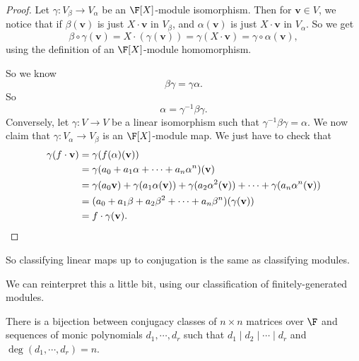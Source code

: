 \documentclass[a4paper]{article}
\begin{document}
\begin{proof}
  Let $\gamma: V_\beta \to V_\alpha$ be an $\F[X]$-module isomorphism. Then for $\mathbf{v} \in V$, we notice that if $\beta (\mathbf{v})$ is just $X \cdot \mathbf{v}$ in $V_\beta$, and $\alpha(\mathbf{v})$ is just $X \cdot \mathbf{v}$ in $V_\alpha$. So we get
  \[
    \beta \circ \gamma(\mathbf{v}) = X \cdot (\gamma(\mathbf{v})) = \gamma(X \cdot \mathbf{v}) = \gamma \circ \alpha(\mathbf{v}),
  \]
  using the definition of an $\F[X]$-module homomorphism.

  So we know
  \[
    \beta\gamma = \gamma\alpha.
  \]
  So
  \[
    \alpha = \gamma^{-1}\beta\gamma.
  \]
  Conversely, let $\gamma: V \to V$ be a linear isomorphism such that $\gamma^{-1}\beta\gamma = \alpha$. We now claim that $\gamma: V_\alpha \to V_\beta$ is an $\F[X]$-module map. We just have to check that
  \begin{align*}
    \gamma(f \cdot \mathbf{v}) &= \gamma(f(\alpha)(\mathbf{v})) \\
    &= \gamma(a_0 + a_1 \alpha + \cdots + a_n \alpha^n) (\mathbf{v})\\
    &= \gamma(a_0 \mathbf{v}) + \gamma(a_1 \alpha(\mathbf{v})) + \gamma (a_2 \alpha^2 (\mathbf{v})) + \cdots + \gamma(a_n \alpha^n(\mathbf{v}))\\
    &= (a_0 + a_1 \beta + a_2 \beta^2 + \cdots + a_n \beta^n)(\gamma(\mathbf{v}))\\
    &= f\cdot \gamma(\mathbf{v}).\qedhere
  \end{align*}
\end{proof}
So classifying linear maps up to conjugation is the same as classifying modules.

We can reinterpret this a little bit, using our classification of finitely-generated modules.
\begin{cor}
  There is a bijection between conjugacy classes of $n \times n$ matrices over $\F$ and sequences of monic polynomials $d_1, \cdots, d_r$ such that $d_1 \mid d_2 \mid \cdots \mid d_r$ and $\deg (d_1,\cdots, d_r) = n$.
\end{cor}
\end{document}
